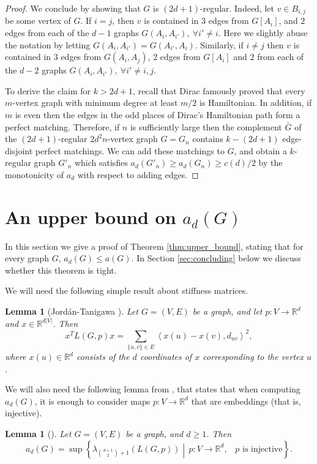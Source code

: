 \documentclass[a4paper,11pt]{article}
\theoremstyle{plain}
\newtheorem{lemma}[theorem]{\bf Lemma}
\theoremstyle{definition}
\newcommand{\Rea}{{\mathbb R}}
\begin{document}
\begin{proof}
We conclude by showing that $G$ is $(2d+1)$-regular. Indeed, let $v\in B_{i,j}$ be some vertex of $G$. If $i=j$, then $v$ is contained in $3$  edges from $G[A_i]$, and $2$ edges from each of the $d-1$ graphs $G(A_i,A_{i'}),~\forall i'\ne i$. Here we slightly abuse the notation by letting $G(A_i,A_{i'})=G(A_{i'},A_i)$. Similarly, if $i\ne j$ then $v$ is contained in $3$ edges from $G(A_i,A_j)$, $2$ edges from $G[A_i]$ and $2$ from each of the $d-2$ graphs $G(A_i,A_{i'}),~\forall i'\ne i,j$.

To derive the claim for $k>2d+1$, recall that Dirac famously proved that every $m$-vertex graph with minimum degree at least $m/2$ is Hamiltonian. In addition, if $m$ is even then the edges in the odd places of Dirac's Hamiltonian path form a perfect matching. 
Therefore, if $n$ is sufficiently large then the complement $\bar G$ of the $(2d+1)$-regular $2d^2 n$-vertex graph $G=G_n$ contains $k-(2d+1)$ edge-disjoint perfect matchings. We can add these matchings to $G$, and obtain a $k$-regular graph $G'_n$ which satisfies $a_d(G'_n) \ge a_d(G_n)\geq c(d)/2$ by the monotonicity of $a_d$ with respect to adding edges. 
\end{proof}


\section{An upper bound on $a_d(G)$}\label{sec:upper_bound}

In this section we give a proof of Theorem \ref{thm:upper_bound}, stating that for every graph $G$, $a_d(G)\leq a(G)$. In Section \ref{sec:concluding} below we discuss whether this theorem is tight.

We will need the following simple result about stiffness matrices.
\begin{lemma}[Jord\'an-Tanigawa {\cite[3.2]{jordan2022rigidity}}]
\label{lemma:quadratic_form}
Let $G=(V,E)$ be a graph, and let $p:V\to \Rea^d$ and $x\in \Rea^{d|V|}$. Then
\[
x^T L(G,p) x = \sum_{\{u,v\}\in E} \left\langle x(u)-x(v), d_{uv}\right\rangle^2,
\]
where $x(u)\in \Rea^d$ consists of the $d$ coordinates of $x$ corresponding to the vertex $u$. 
\end{lemma}

We will also need the following lemma from \cite{lew2022d}, that states that when computing $a_d(G)$, it is enough to consider maps $p:V\to \Rea^d$ that are embeddings (that is, injective).

\begin{lemma}[{\cite[Lemma 2.4]{lew2022d}}]\label{lemma:a_d_equivalent}
Let $G=(V,E)$ be a graph, and $d\geq 1$. Then
\[
a_d(G)=\sup\left\{ \lambda_{\binom{d+1}{2}+1}(L(G,p)) \middle| \, p: V\to \Rea^d, \, \text{ $p$ is injective} \right\}.
\]
\end{lemma}
\end{document}
